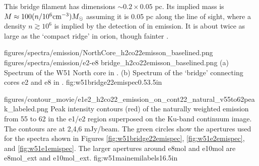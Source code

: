 


This bridge filament has dimensions $\sim0.2\times0.05$ pc.  Its implied mass
is $M\approx100 (n/10^6 \textrm{cm}^{-3}) M_{\odot}$ assuming it is 0.05 pc along the line of
sight, where a density $n\gtrsim10^6$ is implied by the detection of
\formaldehyde \twotwo in emission.  It is about twice as large as the `compact
ridge' in orion, though fainter \citep{Mangum1990a,Mangum1993b}.

\FigureTwo
{{figures/spectra/emission/NorthCore_h2co22emisson_baselined}.png}
{{figures/spectra/emission/e2-e8 bridge_h2co22emisson_baselined}.png}
{(a) Spectrum of the W51 North core in \ortho \twotwo.
(b) Spectrum of the `bridge' connecting cores e2 and e8 in \ortho \twotwo.
}
{fig:w51bridge22emispec}{0.5}{3.5in}

\Figure
{figures/contour_movie/e1e2_h2co22_emission_on_cont22_natural_v55to62peak_labeled.png}
{ Peak intensity contours (red) of the naturally weighted \formaldehyde \twotwo
emission from 55 to 62 \kms in the e1/e2 region superposed on the Ku-band
continuum image.  The contours are at 2,4,6 mJy/beam.  The green circles show
the apertures used for the spectra shown in Figures
\ref{fig:w51bridge22emispec}, \ref{fig:w51e2emispec}, and
\ref{fig:w51e1emispec}.  The larger apertures around e8mol and e10mol are
e8mol\_ext and e10mol\_ext.
}{fig:w51mainemilabels}{1}{6.5in}

